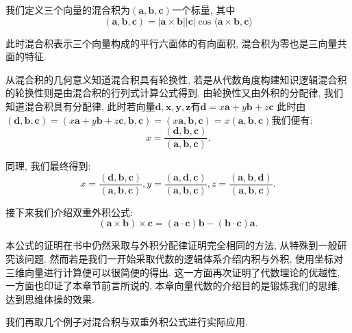 \documentclass[./main.tex]{subfiles}
\begin{document}
我们定义三个向量的混合积为\((\mathbf{a},\mathbf{b},\mathbf{c})\)一个标量, 其中
\[(\mathbf{a},\mathbf{b},\mathbf{c})=\left | \mathbf{a}\times \mathbf{b} \right |\left | \mathbf{c} \right |   \cos\langle\mathbf{a}\times\mathbf{b},\mathbf{c}\rangle\]
 
此时混合积表示三个向量构成的平行六面体的有向面积, 混合积为零也是三向量共面的特征. 

从混合积的几何意义知道混合积具有轮换性, 若是从代数角度构建知识逻辑混合积的轮换性则是由混合积的行列式计算公式得到. 由轮换性又由外积的分配律, 我们知道混合积具有分配律, 此时若向量\(\mathbf{d}, \mathbf{x}, \mathbf{y}, \mathbf{z}\)有\(\mathbf{d}=x\mathbf{a}+y\mathbf{b}+z\mathbf{c}\)
此时由\((\mathbf{d},\mathbf{b},\mathbf{c})=(x\mathbf{a}+y\mathbf{b}+z\mathbf{c},\mathbf{b},\mathbf{c})=(x\mathbf{a},\mathbf{b},\mathbf{c})=x(\mathbf{a},\mathbf{b},\mathbf{c})\)我们便有: 
\[x=\frac{(\mathbf{d},\mathbf{b},\mathbf{c})}{(\mathbf{a},\mathbf{b},\mathbf{c})}.\]

同理, 我们最终得到: \[x=\frac{(\mathbf{d},\mathbf{b},\mathbf{c})}{(\mathbf{a},\mathbf{b},\mathbf{c})}, y=\frac{(\mathbf{a},\mathbf{d},\mathbf{c})}{(\mathbf{a},\mathbf{b},\mathbf{c})}, z=\frac{(\mathbf{a},\mathbf{b},\mathbf{d})}{(\mathbf{a},\mathbf{b},\mathbf{c})}.\]

接下来我们介绍双重外积公式:
\[(\mathbf{a}\times\mathbf{b})\times\mathbf{c}=(\mathbf{a}\cdot\mathbf{c})\mathbf{b}-(\mathbf{b}\cdot\mathbf{c})\mathbf{a}.\]

本公式的证明在书中仍然采取与外积分配律证明完全相同的方法, 从特殊到一般研究该问题. 然而若是我们一开始采取代数的逻辑体系介绍内积与外积, 使用坐标对三维向量进行计算便可以很简便的得出. 这一方面再次证明了代数理论的优越性, 一方面也印证了本章节前言所说的, 本章向量代数的介绍目的是锻炼我们的思维, 达到思维体操的效果. 

我们再取几个例子对混合积与双重外积公式进行实际应用. 
\end{document}
